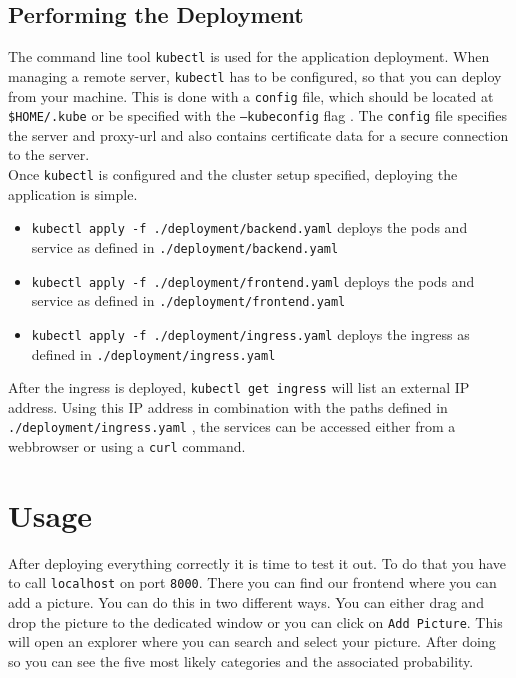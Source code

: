    \subsection{Performing the Deployment}
        The command line tool \texttt{kubectl} is used for the application deployment.
        When managing a remote server, \texttt{kubectl} has to be configured, so that you can deploy from your machine.
        This is done with a \texttt{config} file, which should be located at \texttt{\$HOME/.kube} or be specified with the \texttt{--kubeconfig} flag \cite{Kubernetes_kubeconfig:2022}.
        The \texttt{config} file specifies the server and proxy-url and also contains certificate data for a secure connection to the server.
        \medskip\\
        Once \texttt{kubectl} is configured and the cluster setup specified, deploying the application is simple.
        \begin{itemize}
            \item \texttt{kubectl apply -f ./deployment/backend.yaml} deploys the pods and service as defined in \texttt{./deployment/backend.yaml}
            \item \texttt{kubectl apply -f ./deployment/frontend.yaml} deploys the pods and service as defined in \texttt{./deployment/frontend.yaml}
            \item \texttt{kubectl apply -f ./deployment/ingress.yaml} deploys the ingress as defined in \texttt{./deployment/ingress.yaml}
        \end{itemize}
        After the ingress is deployed, \texttt{kubectl get ingress} will list an external IP address.
        Using this IP address in combination with the paths defined in \texttt{./deployment/ingress.yaml} , the services can be accessed either from a webbrowser or using a \texttt{curl} command.
    
\section{Usage}
After deploying everything correctly it is time to test it out. To do that you have to call \texttt{localhost} on port \texttt{8000}. There you can find our frontend where you can add a picture. You can do this in two different ways. You can either drag and drop the picture to the dedicated window or you can click on \texttt{Add Picture}. This will open an explorer where you can search and select your picture. After doing so you can see the five most likely categories and the associated probability.
